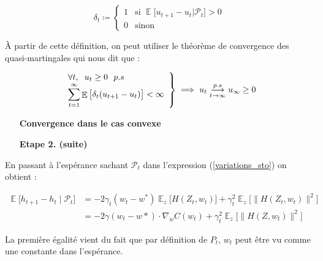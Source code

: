 \documentclass{article}
\DeclareMathOperator*{\E}{\mathbb{E}} %
\begin{document}
\begin{equation*}
\delta_t \coloneqq
    \left\{
        \begin{array}{ll}
            1 & \text{si } \E \big[u_{t+1} - u_{t}|\mathcal{P}_t\big] > 0 \\
            0 & \text{sinon}
        \end{array}
    \right.
\end{equation*}

À partir de cette définition, on peut utiliser le théorème de convergence des quasi-martingales qui nous dit que : 

\begin{equation*}
    \left.
        \begin{array}{ll}
            \forall t, \hspace{0.2cm} u_t\geq 0~~p.s \\
             \displaystyle \sum_{t=1}^{\infty} \E\big[\delta_t(u_{t+1 }- u_t)\big] < \infty
        \end{array}
    \right \} 
    \implies u_t \underset{t\rightarrow\infty}{\overset{p.s}{\longrightarrow}}u_{\infty} \geq 0
\end{equation*}
\bigskip

\begin{itemize}
    \item[\textbf{Convergence dans le cas convexe}]
\end{itemize}
\bigskip

\begin{itemize}
\item[\textbf{Etape 2. (suite)}]
\end{itemize}
\bigskip 

En passant à l'espérance sachant $\mathcal{P}_t$ dans l'expression (\ref{variations_sto}) on obtient :

\begin{equation*}
    \begin{split}
         \E \big[h_{t+1} - h_t \mid \mathcal{P}_t \big] & = -2 \gamma_t(w_t - w^*) {\textstyle \E_{z}} \big[H(Z_t, w_t)\big] + \gamma_t^2 {\textstyle\E_{z}} \big[\lVert H(Z_t,w_t) \rVert^2\big] \\
            & = -2\gamma(w_t - w*) \cdot \nabla_wC(w_t) + \gamma_t^2 {\textstyle\E_{z}} \big[\lVert H(Z,w_t) \rVert^2\big]
    \end{split}
\end{equation*}

La première égalité vient du fait que par définition de $P_t$, $w_t$ peut être vu comme une constante dans l'espérance. 
\end{document}
